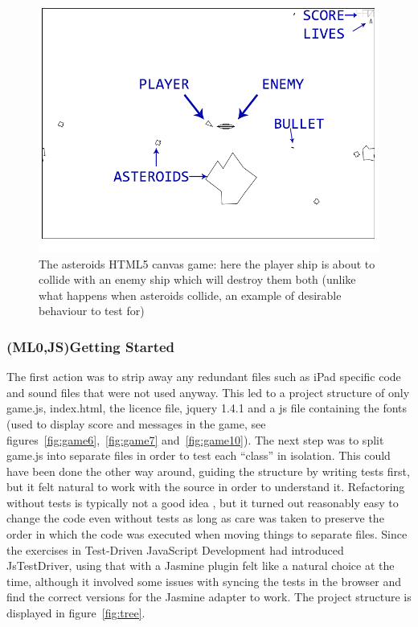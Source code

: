 \documentclass[11pt]{article}
\begin{document}
\begin{figure}[ht!]
\centering
\includegraphics[width=1.0\textwidth]{pics/game3.png}
\caption{The asteroids HTML5 canvas game: here the player ship is about to collide with an enemy ship which will destroy them both (unlike what happens when asteroids collide, an example of desirable behaviour to test for)}
\label{fig:game3}
\end{figure}

\subsubsection{(ML0,JS)Getting Started}

The first action was to strip away any redundant files such as iPad specific code and sound files that were not used anyway. This led to a project structure of only game.js, index.html, the licence file, jquery 1.4.1 and a \gls{js} file containing the fonts (used to display score and messages in the game, see figures~\ref{fig:game6},~\ref{fig:game7} and~\ref{fig:game10}). The next step was to split game.js into separate files in order to test each ``class'' in isolation. This could have been done the other way around, guiding the structure by writing tests first, but it felt natural to work with the source in order to understand it. Refactoring without tests is typically not a good idea \cite[p.~17]{Refactoring}, but it turned out reasonably easy to change the code even without tests as long as care was taken to preserve the order in which the code was executed when moving things to separate files. Since the exercises in Test-Driven JavaScript Development\cite{Tddjs} had introduced JsTestDriver, using that with a Jasmine plugin felt like a natural choice at the time, although it involved some issues with syncing the tests in the browser and find the correct versions for the Jasmine adapter to work. The project structure is displayed in figure~\ref{fig:tree}.
\end{document}
